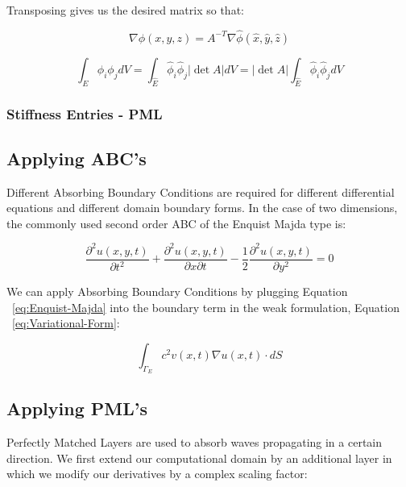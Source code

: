 Transposing gives us the desired matrix so that:

\begin{equation}
\nabla \phi(x,y,z) = A^{-T} \nabla \hat{\phi}(\hat{x}, \hat{y}, \hat{z})
\end{equation}


\begin{equation}
\int_E \phi_i \phi_j dV = \int_{\hat{E}} \hat{\phi}_i \hat{\phi}_j |\det A| dV = |\det A| \int_{\hat{E}} \hat{\phi}_i \hat{\phi}_j dV 
\end{equation}

\subsubsection{Stiffness Entries - PML}
 

\subsection{Applying ABC's}

Different Absorbing Boundary Conditions are required for different differential equations and different domain boundary forms. In the case of two dimensions, the commonly used second order ABC of the Enquist Majda type is:

\begin{equation}
\frac{\partial^2 u(x,y,t)}{\partial t^2} + \frac{\partial^2 u(x,y,t)}{\partial x \partial t} - \frac{1}{2} \frac{\partial^2 u(x,y,t)}{\partial y^2} = 0
\label{eq:Enquist-Majda}
\end{equation}

We can apply Absorbing Boundary Conditions by plugging Equation ~\ref{eq:Enquist-Majda} into the boundary term in the weak formulation, Equation ~\ref{eq:Variational-Form}:

\begin{equation}
\int_{\Gamma_E} c^2 v(x,t) \nabla u(x,t) \cdot dS
\end{equation}



\subsection{Applying PML's}

Perfectly Matched Layers are used to absorb waves propagating in a certain direction. We first extend our computational domain by an additional layer in which we modify our derivatives by a complex scaling factor:

